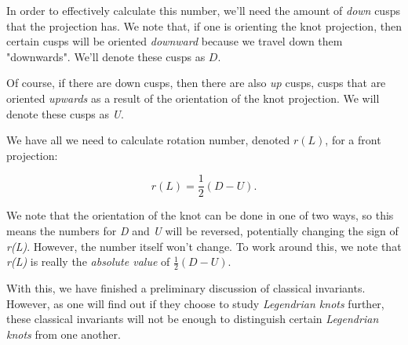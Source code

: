 \documentclass{article}
\begin{document}
In order to effectively calculate this number, we'll need the amount of \textit{down} cusps
that the projection has. We note that, if one is orienting the knot projection, then certain
cusps will be oriented \textit{downward} because we travel down them "downwards". We'll denote
these cusps as $D$.

Of course, if there are down cusps, then there are also \textit{up} cusps, cusps that
are oriented \textit{upwards} as a result of the orientation of the knot projection. We will
denote these cusps as \textit{U}.

We have all we need to calculate rotation number, denoted $r(L)$, for
a front projection:

\[r(L) = \frac{1}{2}(D - U).\]

We note that the orientation of the knot can be done in one of two ways,
so this means the numbers for \textit{D} and \textit{U} will be reversed,
potentially changing the sign of \textit{r(L)}. However, the number itself
won't change. To work around this, we note that \textit{r(L)} is really
the \textit{absolute value} of $\frac{1}{2}(D - U).$


With this, we have finished a preliminary discussion of classical invariants.
However, as one will find out if they choose to study \textit{Legendrian knots}
further, these classical invariants will not be enough to distinguish certain
\textit{Legendrian knots} from one another.




\end{document}
